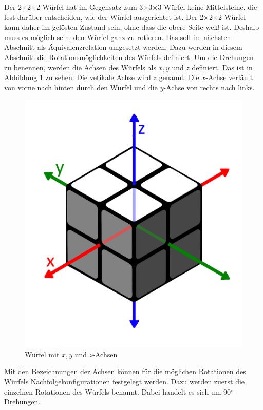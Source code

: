 \documentclass[12pt,a4paper, usenames, dvipsnames]{article}
\theoremstyle{mystyle}
\theoremstyle{definition}
\newcommand{\Ttwo}{2$\times$2$\times$2-}
\newcommand{\Tthree}{3$\times$3$\times$3-}
\begin{document}
Der \Ttwo Würfel hat im Gegensatz zum \Tthree Würfel keine Mittelsteine, die fest darüber entscheiden, wie der Würfel ausgerichtet ist. 
Der \Ttwo Würfel kann daher im gelösten Zustand sein, ohne dass die obere Seite weiß ist. Deshalb muss es möglich sein, den Würfel ganz zu rotieren.
Das soll im nächsten Abschnitt als Äquivalenzrelation umgesetzt werden. Dazu werden in diesem Abschnitt die Rotationsmöglichkeiten des Würfels definiert.
Um die Drehungen zu benennen, werden die Achsen des Würfels als $x, y$ und $z$ definiert. Das ist in Abbildung \ref{Abbildung_Rotationsachsen} zu sehen. Die vetikale Achse wird $z$ genannt. Die $x$-Achse verläuft von vorne nach hinten durch den Würfel und die $y$-Achse von rechts nach links.
\begin{figure}[H]
\centering
\includegraphics[scale=0.13]{Pfeile.png}
\caption[Würfel mit $x, y$ und $z$-Achsen]{Würfel mit $x, y$ und $z$-Achsen}
\label{Abbildung_Rotationsachsen}
\end{figure} 

Mit den Bezeichnungen der Achsen können für die möglichen Rotationen des Würfels Nachfolgekonfigurationen festgelegt werden. 
Dazu werden zuerst die einzelnen Rotationen des Würfels benannt. Dabei handelt es sich um 90$^\circ$-Drehungen.
\end{document}
